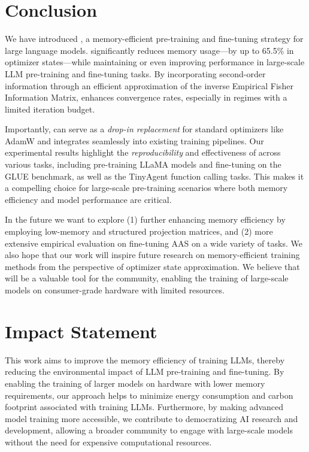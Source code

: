 \section{Conclusion}

We have introduced \textit{\lowrank}, a memory-efficient pre-training and fine-tuning strategy for large language models. \textit{\lowrank} significantly reduces memory usage—by up to 65.5\% in optimizer states—while maintaining or even improving performance in large-scale LLM pre-training and fine-tuning tasks. By incorporating second-order information through an efficient approximation of the inverse Empirical Fisher Information Matrix, \textit{\lowrank} enhances convergence rates, especially in regimes with a limited iteration budget.

Importantly, \textit{\lowrank} can serve as a \emph{drop-in replacement} for standard optimizers like AdamW and integrates seamlessly into existing training pipelines. Our experimental results highlight the \textit{reproducibility} and effectiveness of \textit{\lowrank} across various tasks, including pre-training LLaMA models and fine-tuning on the GLUE benchmark, as well as the TinyAgent function calling tasks. This makes it a compelling choice for large-scale pre-training scenarios where both memory efficiency and model performance are critical.

In the future we want to explore (1) further enhancing memory efficiency by employing low-memory and structured projection matrices, and (2) more extensive empirical evaluation on fine-tuning AAS on a wide variety of tasks. We also hope that our work will inspire future research on memory-efficient training methods from the perspective of optimizer state approximation. We believe that \textit{\lowrank} will be a valuable tool for the community, enabling the training of large-scale models on consumer-grade hardware with limited resources.

\section*{Impact Statement}

This work aims to improve the memory efficiency of training LLMs, thereby reducing the environmental impact of LLM pre-training and fine-tuning. By enabling the training of larger models on hardware with lower memory requirements, our approach helps to minimize energy consumption and carbon footprint associated with training LLMs. Furthermore, by making advanced model training more accessible, we contribute to democratizing AI research and development, allowing a broader community to engage with large-scale models without the need for expensive computational resources.
